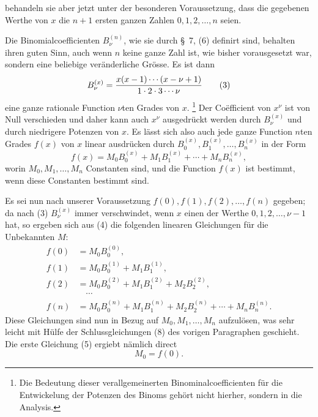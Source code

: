 
behandeln sie aber jetzt unter der besonderen Voraussetzung, dass die gegebenen Werthe von $x$ die $n+1$ ersten ganzen Zahlen $0,1,2,\ldots,n$ seien.

Die Binomialcoefficienten $B_\nu^{(n)}$, wie sie durch \S~7, (6) definirt sind, behalten ihren guten Sinn, auch wenn $n$ keine ganze Zahl ist, wie bisher vorausgesetzt war, sondern eine beliebige veränderliche Grösse. Es ist dann
\begin{equation}
 B_\nu^{(x)}={x(x-1)\cdots(x-\nu+1)\over 1\cdot2\cdot3\cdots\nu}
\tag{3}
\end{equation}
eine ganze rationale Function $\nu$ten Grades von $x$.
\footnote{Die Bedeutung dieser verallgemeinerten Binominalcoefficienten für die Entwickelung der Potenzen des Binoms gehört nicht hierher, sondern in die Analysis.}
Der Coëfficient von $x^\nu$ ist von Null verschieden und daher kann auch $x^\nu$ ausgedrückt werden durch $B_\nu^{(x)}$ und durch niedrigere Potenzen von $x$. Es lässt sich also auch jede ganze Function $n$ten Grades $f(x)$ von $x$ linear ausdrücken durch $B_0^{(x)},B_1^{(x)},\ldots,B_n^{(x)}$ in der Form
\begin{equation}
 f(x)=M_0B_0^{(x)}+M_1B_1^{(x)}+\cdots+M_nB_n^{(x)},
\tag{4}
\end{equation}
worin $M_0,M_1,\ldots,M_n$ Constanten sind, und die Function $f(x)$ ist bestimmt, wenn diese Constanten bestimmt sind.

Es sei nun nach unserer Voraussetzung $f(0),f(1),f(2),\ldots,f(n)$ gegeben; da nach (3) $B_\nu^{(x)}$ immer verschwindet, wenn $x$ einen der Werthe $0,1,2,\ldots,\nu-1$ hat, so ergeben sich aus (4) die folgenden linearen Gleichungen für die Unbekannten $M$:
\begin{equation}
\begin{aligned}
 f(0)&=M_0B_0^{(0)},\\
 f(1)&=M_0B_0^{(1)}+M_1B_1^{(1)},\\
 f(2)&=M_0B_0^{(2)}+M_1B_1^{(2)}+M_2B_2^{(2)},\\
 &\quad\cdots\\
 f(n)&=M_0B_0^{(n)}+M_1B_1^{(n)}+M_2B_2^{(n)}+\cdots+M_nB_n^{(n)}.
\end{aligned}
\tag{5}
\end{equation}
Diese Gleichungen sind nun in Bezug auf $M_0,M_1,\ldots,M_n$ aufzulösen, was sehr leicht mit Hülfe der Schlussgleichungen (8) des vorigen Paragraphen geschieht. Die erste Gleichung (5) ergiebt nämlich direct
\begin{equation}
 M_0=f(0).
\tag{6}
\end{equation}
